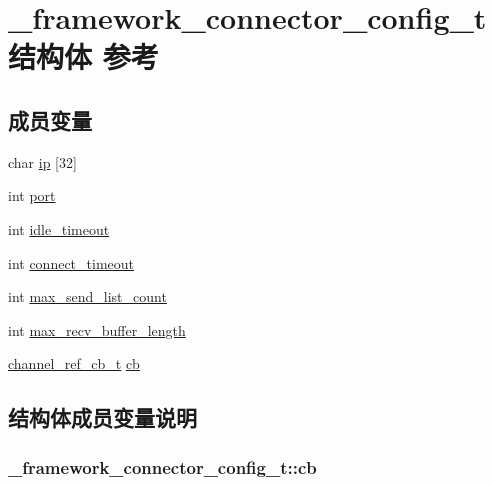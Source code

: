 \hypertarget{a00011}{}\section{\+\_\+framework\+\_\+connector\+\_\+config\+\_\+t结构体 参考}
\label{a00011}
\subsection*{成员变量}
\begin{DoxyCompactItemize}
\item 
char \hyperlink{a00011_a09a135e761eb026e64952e76ca193c1b_a09a135e761eb026e64952e76ca193c1b}{ip} \mbox{[}32\mbox{]}
\item 
int \hyperlink{a00011_a5427527be42630baf3fc0497e74e4d4d_a5427527be42630baf3fc0497e74e4d4d}{port}
\item 
int \hyperlink{a00011_a103e36450fc30baa72acc26b7efd5b98_a103e36450fc30baa72acc26b7efd5b98}{idle\+\_\+timeout}
\item 
int \hyperlink{a00011_a02f7315d98e5e2872fde99130da6b7c8_a02f7315d98e5e2872fde99130da6b7c8}{connect\+\_\+timeout}
\item 
int \hyperlink{a00011_ac6e964a4a4ca24a176016275955a4e05_ac6e964a4a4ca24a176016275955a4e05}{max\+\_\+send\+\_\+list\+\_\+count}
\item 
int \hyperlink{a00011_a7f803ef991aaf690e9b3585c423511d1_a7f803ef991aaf690e9b3585c423511d1}{max\+\_\+recv\+\_\+buffer\+\_\+length}
\item 
\hyperlink{a00050_ae296ec4d1ce108960de8dcc423956a1d_ae296ec4d1ce108960de8dcc423956a1d}{channel\+\_\+ref\+\_\+cb\+\_\+t} \hyperlink{a00011_a7aeae2c4a7d06ea452374fb40434e1c7_a7aeae2c4a7d06ea452374fb40434e1c7}{cb}
\end{DoxyCompactItemize}


\subsection{结构体成员变量说明}
\hypertarget{a00011_a7aeae2c4a7d06ea452374fb40434e1c7_a7aeae2c4a7d06ea452374fb40434e1c7}{}
\subsubsection[{cb}]{ \+\_\+framework\+\_\+connector\+\_\+config\+\_\+t\+::cb}\label{a00011_a7aeae2c4a7d06ea452374fb40434e1c7_a7aeae2c4a7d06ea452374fb40434e1c7}
\hypertarget{a00011_a02f7315d98e5e2872fde99130da6b7c8_a02f7315d98e5e2872fde99130da6b7c8}{}
